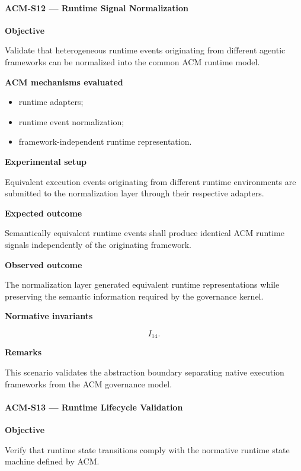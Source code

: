 \documentclass[10pt]{article}
\begin{document}
\paragraph{ACM-S12 --- Runtime Signal Normalization}

\textbf{Objective}

Validate that heterogeneous runtime events originating from different agentic
frameworks can be normalized into the common ACM runtime model.

\textbf{ACM mechanisms evaluated}

\begin{itemize}
    \item runtime adapters;
    \item runtime event normalization;
    \item framework-independent runtime representation.
\end{itemize}

\textbf{Experimental setup}

Equivalent execution events originating from different runtime environments are
submitted to the normalization layer through their respective adapters.

\textbf{Expected outcome}

Semantically equivalent runtime events shall produce identical ACM runtime
signals independently of the originating framework.

\textbf{Observed outcome}

The normalization layer generated equivalent runtime representations while
preserving the semantic information required by the governance kernel.

\textbf{Normative invariants}

\[
I_{14}.
\]

\textbf{Remarks}

This scenario validates the abstraction boundary separating native execution
frameworks from the ACM governance model.

\paragraph{ACM-S13 --- Runtime Lifecycle Validation}

\textbf{Objective}

Verify that runtime state transitions comply with the normative runtime state
machine defined by ACM.
\end{document}
